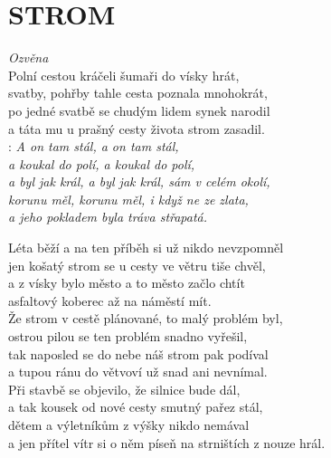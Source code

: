 \section*{\Huge STROM}
\emph{Ozvěna}\\

Polní cestou kráčeli šumaři do vísky hrát,\\
svatby, pohřby tahle cesta poznala mnohokrát,\\
po jedné svatbě se chudým lidem synek narodil\\
a táta mu u prašný cesty života strom zasadil.\\

\textregistered: \emph{A on tam stál, a on tam stál,\\
a koukal do polí, a koukal do polí,\\
a byl jak král, a byl jak král, sám v celém okolí,\\
korunu měl, korunu měl, i když ne ze zlata,\\
a jeho pokladem byla tráva střapatá.}\\

\begin{Large}

Léta běží a na ten příběh si už nikdo nevzpomněl\\
jen košatý strom se u cesty ve větru tiše chvěl,\\
a z vísky bylo město a to město začlo chtít\\
asfaltový koberec až na náměstí mít. \textregistered\\

Že strom v cestě plánované, to malý problém byl,\\
ostrou pilou se ten problém snadno vyřešil,\\
tak naposled se do nebe náš strom pak podíval\\
a tupou ránu do větvoví už snad ani nevnímal. \textregistered\\

Při stavbě se objevilo, že silnice bude dál,\\
a tak kousek od nové cesty smutný pařez stál,\\
dětem a výletníkům z výšky nikdo nemával\\
a jen přítel vítr si o něm píseň na strništích z nouze hrál. \textregistered

\end{Large}

\newpage

